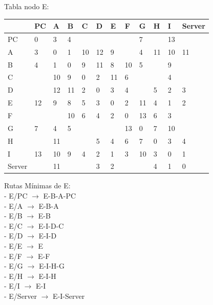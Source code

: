 \documentclass[a4paper]{article}
\begin{document}
\begin{table}[ht]
Tabla nodo E:\\
\begin{tabular}{|l|l|l|l|l|l|l|l|l|l|l|l|}
\hline
       & PC & A  & B & C & D & E & F & G & H & I  & Server \\ \hline
PC     & 0  & 3  & 4 &   &   &   &   & 7 &   & 13 &        \\ \hline
A      & 3  & 0  & 1 & 10& 12& 9 &   & 4 & 11& 10 & 11     \\ \hline
B      & 4  & 1  & 0 & 9 & 11& 8 & 10& 5 &   & 9  &        \\ \hline
C      &    & 10 & 9 & 0 & 2 & 11& 6 &   &   & 4  &        \\ \hline
D      &    & 12 & 11& 2 & 0 & 3 & 4 &   & 5 & 2  & 3      \\ \hline
E      & 12 & 9  & 8 & 5 & 3 & 0 & 2 & 11& 4 & 1  & 2      \\ \hline
F      &    &    & 10& 6 & 4 & 2 & 0 & 13& 6 & 3  &        \\ \hline
G      & 7  & 4  & 5 &   &   &   & 13& 0 & 7 & 10 &        \\ \hline
H      &    & 11 &   &   & 5 & 4 & 6 & 7 & 0 & 3  & 4      \\ \hline
I      & 13 & 10 & 9 & 4 & 2 & 1 & 3 & 10& 3 & 0  & 1      \\ \hline
Server &    & 11 &   &   & 3 & 2 &   &   & 4 & 1  & 0      \\ \hline
\end{tabular}

Rutas Mínimas de E:\\
-	E/PC  $\rightarrow$  E-B-A-PC\\
-	E/A  $\rightarrow$  E-B-A\\
-	E/B  $\rightarrow$  E-B\\
-	E/C  $\rightarrow$  E-I-D-C\\
-	E/D  $\rightarrow$  E-I-D\\
-	E/E  $\rightarrow$  E\\
-	E/F  $\rightarrow$  E-F\\
-	E/G  $\rightarrow$  E-I-H-G\\
-	E/H  $\rightarrow$  E-I-H\\
-	E/I  $\rightarrow$  E-I\\
-	E/Server  $\rightarrow$  E-I-Server\\
\end{table}


\clearpage
\end{document}
